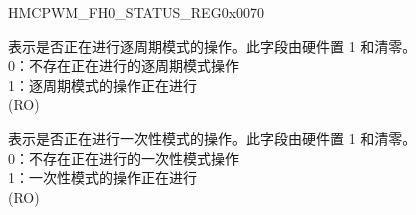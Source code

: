 \begin{register}{H}{MCPWM\_FH0\_STATUS\_REG}{0x0070}\label{regdesc:MCPWMFH0STATUSREG}
%
%
%
\regnewline%
\begin{regdesc}\begin{reglist}
\label{fielddesc:MCPWMFH0CBCON}\item [MCPWM\_FH0\_CBC\_ON] 表示是否正在进行逐周期模式的操作。此字段由硬件置 1 和清零。\\
0：不存在正在进行的逐周期模式操作\\
1：逐周期模式的操作正在进行\\
(RO)
\label{fielddesc:MCPWMFH0OSTON}\item [MCPWM\_FH0\_OST\_ON] 表示是否正在进行一次性模式的操作。此字段由硬件置 1 和清零。\\
0：不存在正在进行的一次性模式操作\\
1：一次性模式的操作正在进行\\
(RO)
\end{reglist}\end{regdesc}
\end{register}


